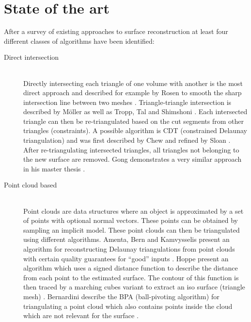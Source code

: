 
\chapter{State of the art}
\label{ch:state_of_the_art}


After a survey of existing approaches to surface reconstruction at least four different classes of algorithms have been identified:

\begin{description}
	
	\item[Direct intersection] \hfill \\
	Directly intersecting each triangle of one volume with another is the most direct approach and described for example by Rosen to smooth the sharp intersection line between two meshes \cite{mesh_intersection}. Triangle-triangle intersection is described by M\"oller \cite{tri_tri_intersection_moller} as well as Tropp, Tal and Shimshoni \cite{tri_tri_intersection_2}. Each intersected triangle can then be re-triangulated based on the cut segments from other triangles (constraints). A possible algorithm is CDT (constrained Delaunay triangulation) and was first described by Chew \cite{CDT} and refined by Sloan \cite{CDT_fast}. After re-triangulating intersected triangles, all triangles not belonging to the new surface are removed. Gong demonstrates a very similar approach in his master thesis \cite{cutter_workpiece_engagement}.
	
	\item[Point cloud based] \hfill \\
	Point clouds are data structures where an object is approximated by a set of points with optional normal vectors. These points can be obtained \eg by sampling an implicit model. These point clouds can then be triangulated using different algorithms. 
	Amenta, Bern and Kamvysselis present an algorithm for reconstructing Delaunay triangulations from point clouds with certain quality guarantees for \enquote{good} inputs \cite{vornoi_surface_reconstruction}.
	Hoppe \etal present an algorithm which uses a signed distance function to describe the distance from each point to the estimated surface. The contour of this function is then traced by a marching cubes variant to extract an iso surface (triangle mesh) \cite{surface_reconstruction}.
	Bernardini \etal describe the BPA (ball-pivoting algorithm) for triangulating a point cloud which also contains points inside the cloud which are not relevant for the surface \cite{BPA}.
	

\end{description}
